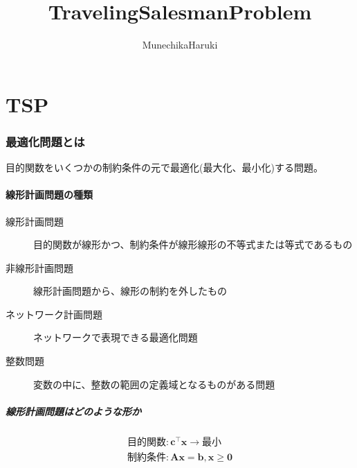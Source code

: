 \documentclass[9pt]{ltjsarticle}
\begin{document}
\title{TravelingSalesmanProblem}
\author{MunechikaHaruki}
\maketitle

\part{TSP}
\setcounter{tocdepth}{3}
\tableofcontents

\newpage
\section{最適化問題とは}
目的関数をいくつかの制約条件の元で最適化(最大化、最小化)する問題。

\subsection{線形計画問題の種類}
\begin{description}
    \item[線形計画問題] 目的関数が線形かつ、制約条件が線形線形の不等式または等式であるもの
    \item[非線形計画問題] 線形計画問題から、線形の制約を外したもの
    \item[ネットワーク計画問題] ネットワークで表現できる最適化問題
    \item[整数問題] 変数の中に、整数の範囲の定義域となるものがある問題
\end{description}
\subsubsection{線形計画問題はどのような形か}
\begin{tcolorbox}[title=線形計画問題の標準形]
    \begin{gather*}
        \text{目的関数}:\bm{c}^\top \bm{x}
        \longrightarrow \text{最小}\\        
        \text{制約条件}:\bm{Ax}=\bm{b},\bm{x} \ge \bm{0}
    \end{gather*}
\end{tcolorbox}
\end{document}
